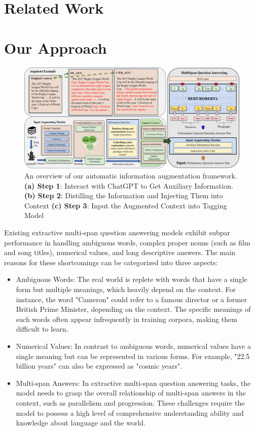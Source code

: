 \documentclass[mathematics,article,submit,moreauthors]{Definitions/mdpi}
\newcommand{\1}[1]{\mathds{1}\left[#1\right]}
\begin{document}
\section{Related Work}
\label{sec:related}


\section{Our Approach}

	\begin{figure}[H]
	\centering
	\includegraphics[width=14.0cm]{overview.png}
	\caption{An overview of our automatic information augmentation framework. \textbf{(a) Step 1}: Interact with ChatGPT to Get Auxiliary Information. \textbf{(b) Step 2}: Distilling the Information and Injecting Them into Context \textbf{(c) Step 3}: Input the Augmented Context into Tagging Model}
	\label{fig:overview}
	\end{figure}   


	Existing extractive multi-span question answering models exhibit subpar performance in handling ambiguous words, complex proper nouns (such as film and song titles), numerical values, and long descriptive answers. The main reasons for these shortcomings can be categorized into three aspects:
	\begin{itemize}
		\item Ambiguous Words: The real world is replete with words that have a single form but multiple meanings, which heavily depend on the context. For instance, the word "Cameron" could refer to a famous director or a former British Prime Minister, depending on the context. The specific meanings of such words often appear infrequently in training corpora, making them difficult to learn.
		\item Numerical Values: In contrast to ambiguous words, numerical values have a single meaning but can be represented in various forms. For example, "22.5 billion years" can also be expressed as "cosmic years".
		\item Multi-span Answers: In extractive multi-span question answering tasks, the model needs to grasp the overall relationship of multi-span answers in the context, such as parallelism and progression.
		These challenges require the model to possess a high level of comprehensive understanding ability and knowledge about language and the world.
	\end{itemize}
	
\end{document}
